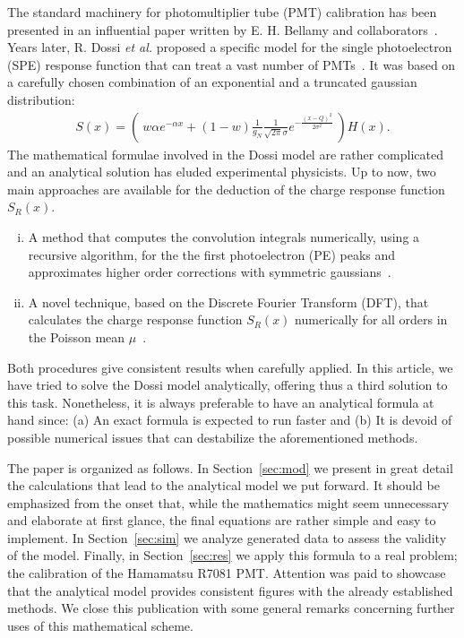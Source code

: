 \documentclass[preprint,12pt]{elsarticle}
\begin{document}
The standard machinery for photomultiplier tube (PMT) calibration has been presented in an influential paper written by E. H. Bellamy and collaborators~\cite{bellamy}. 
Years later, R. Dossi \emph{et al.} proposed a specific model for the single photoelectron (SPE) response function that can treat a vast number of PMTs~\cite{dossi}. 
It was based on a carefully chosen combination of an exponential and a truncated gaussian distribution:
\begin{align}
S(x) =    \left( \ w \alpha e^{-\alpha x } + (1-w)\frac{1}{g_N} \frac{1}{\sqrt{2\pi}\sigma} e^{ - \frac{( x - Q )^2}{2\sigma^2}} \ \right) H(x).       \label{eq:S}
\end{align}
The mathematical formulae involved in the Dossi model are rather complicated and an analytical solution has eluded experimental physicists. 
Up to now, two main approaches are available for the deduction of the charge response function $S_R(x)$.
\begin{enumerate}[i.]
\item  A method that computes the convolution integrals numerically, using a recursive algorithm, 
for the the first photoelectron (PE) peaks and approximates higher order corrections with symmetric gaussians~\cite{dossi}. 
\item A novel technique, based on the Discrete Fourier Transform (DFT), that calculates the charge response function $S_R(x)$ numerically for all orders in the Poisson mean $\mu$~\cite{me}. 
\end{enumerate}
Both procedures give consistent results when carefully applied. 
In this article, we have tried to solve the Dossi model analytically, offering thus a third solution to this task. 
Nonetheless, it is always preferable to have an analytical formula at hand since: 
(a) An exact formula is expected to run faster and 
(b) It is devoid of possible numerical issues that can destabilize the aforementioned methods.  

The paper is organized as follows. 
In Section~\ref{sec:mod} we present in great detail the calculations that lead to the analytical model we put forward. 
It should be emphasized from the onset that, while the mathematics might seem unnecessary and elaborate at first glance, the final equations are rather simple and easy to implement. 
In Section~\ref{sec:sim} we analyze generated data to assess the validity of the model. 
Finally, in Section~\ref{sec:res} we apply this formula to a real problem; the calibration of the Hamamatsu R7081 PMT. 
Attention was paid to showcase that the analytical model provides consistent figures with the already established methods. 
We close this publication with some general remarks concerning further uses of this mathematical scheme. 
\end{document}
